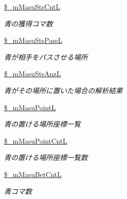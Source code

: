 \begin{DoxyCompactItemize}
\mbox{\label{class_reversi_a860ce7417213f610eba14e79c6715f83}} 
\hyperlink{class_reversi_a860ce7417213f610eba14e79c6715f83}{\$\+\_\+m\+Masu\+Sts\+CntL}
\begin{DoxyCompactList}\small\item\em 青の獲得コマ数 \end{DoxyCompactList}\item 
\mbox{\label{class_reversi_a6d98a68c97f554ad389ebf35db5351f0}} 
\hyperlink{class_reversi_a6d98a68c97f554ad389ebf35db5351f0}{\$\+\_\+m\+Masu\+Sts\+PassL}
\begin{DoxyCompactList}\small\item\em 青が相手をパスさせる場所 \end{DoxyCompactList}\item 
\mbox{\label{class_reversi_a898f51c5935e6e14e5b4fe64287f9b2e}} 
\hyperlink{class_reversi_a898f51c5935e6e14e5b4fe64287f9b2e}{\$\+\_\+m\+Masu\+Sts\+AnzL}
\begin{DoxyCompactList}\small\item\em 青がその場所に置いた場合の解析結果 \end{DoxyCompactList}\item 
\mbox{\label{class_reversi_afbb0c4e7e3e9974fd20727287e49d6ac}} 
\hyperlink{class_reversi_afbb0c4e7e3e9974fd20727287e49d6ac}{\$\+\_\+m\+Masu\+PointL}
\begin{DoxyCompactList}\small\item\em 青の置ける場所座標一覧 \end{DoxyCompactList}\item 
\mbox{\label{class_reversi_a4953efeebd1948a6482816c2123329b9}} 
\hyperlink{class_reversi_a4953efeebd1948a6482816c2123329b9}{\$\+\_\+m\+Masu\+Point\+CntL}
\begin{DoxyCompactList}\small\item\em 青の置ける場所座標一覧数 \end{DoxyCompactList}\item 
\mbox{\label{class_reversi_a1d2faac7092989202db9180bf6dd9fab}} 
\hyperlink{class_reversi_a1d2faac7092989202db9180bf6dd9fab}{\$\+\_\+m\+Masu\+Bet\+CntL}
\begin{DoxyCompactList}\small\item\em 青コマ数 \end{DoxyCompactList}\item 

\end{DoxyCompactItemize}
